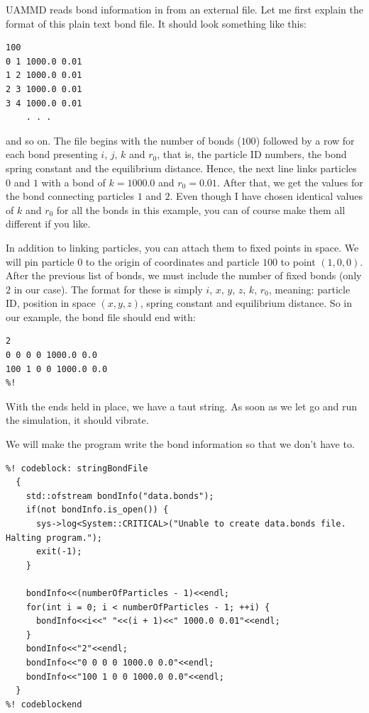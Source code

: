 UAMMD reads bond information in from an external file. Let me first explain the
format of this plain text bond file. It should look something like this:
\begin{lstlisting}
100
0 1 1000.0 0.01
1 2 1000.0 0.01
2 3 1000.0 0.01
3 4 1000.0 0.01
    . . .
\end{lstlisting}
and so on. The file begins with the number of bonds ($100$) followed by a row
for each bond presenting $i$, $j$, $k$ and $r_0$, that is, the particle ID
numbers, the bond spring constant and the equilibrium distance. Hence, the next
line links particles $0$ and $1$ with a bond of $k = 1000.0$ and $r_0 = 0.01$.
After that, we get the values for the bond connecting particles $1$ and $2$.
Even though I have chosen identical values of $k$ and $r_0$ for all the bonds in
this example, you can of course make them all different if you like.

In addition to linking particles, you can attach them to fixed points in space.
We will pin particle $0$ to the origin of coordinates and particle $100$ to
point $(1, 0, 0)$. After the previous list of bonds, we must include the number
of fixed bonds (only $2$ in our case). The format for these is simply $i$, $x$,
$y$, $z$, $k$, $r_0$, meaning: particle ID, position in space $(x, y, z)$,
spring constant and equilibrium distance. So in our example, the bond file
should end with:
\begin{lstlisting}
2
0 0 0 0 1000.0 0.0
100 1 0 0 1000.0 0.0
%!
\end{lstlisting}
With the ends held in place, we have a taut string. As soon as we let go and run
the simulation, it should vibrate.

We will make the program write the bond information so that we don't have to.
\begin{lstlisting}
%! codeblock: stringBondFile
  {
    std::ofstream bondInfo("data.bonds");
    if(not bondInfo.is_open()) {
      sys->log<System::CRITICAL>("Unable to create data.bonds file. Halting program.");
      exit(-1);
    }

    bondInfo<<(numberOfParticles - 1)<<endl;
    for(int i = 0; i < numberOfParticles - 1; ++i) {
      bondInfo<<i<<" "<<(i + 1)<<" 1000.0 0.01"<<endl;
    }
    bondInfo<<"2"<<endl;
    bondInfo<<"0 0 0 0 1000.0 0.0"<<endl;
    bondInfo<<"100 1 0 0 1000.0 0.0"<<endl;
  }
%! codeblockend
\end{lstlisting}

